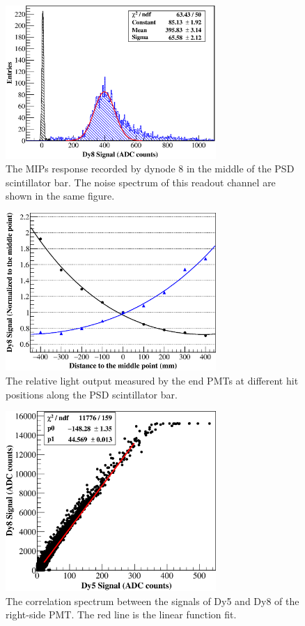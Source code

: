 \documentclass[preprint, times]{elsarticle}
\begin{document}
\begin{figure}[h]
	\centering
	\includegraphics[width=80mm]{mip}
	\caption{The MIPs response recorded by dynode 8 in the middle of the PSD scintillator bar. The noise spectrum of this readout channel are shown in the same figure.}
	\label{fig:mip}
\end{figure}

\begin{figure}[h]
	\centering
	\includegraphics[width=80mm]{attenuation}
	\caption{The relative light output measured by the end PMTs at different hit positions along the PSD scintillator bar.}
	\label{fig:attenuation}
\end{figure}

\begin{figure}[h]
	\centering
	\includegraphics[width=80mm]{dy58}
	\caption{The correlation spectrum between the signals of Dy5 and Dy8 of the right-side PMT. The red line is the linear function fit.}
	\label{fig:dy58}
\end{figure}
\end{document}

